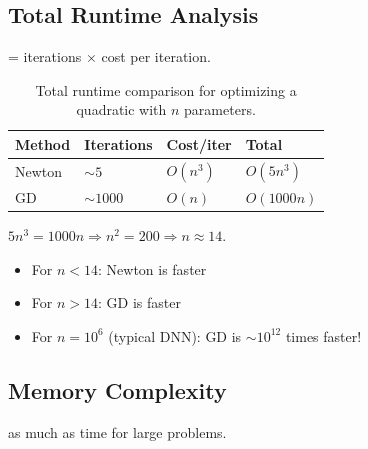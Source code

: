 \subsection{Total Runtime Analysis}

 = iterations $\times$ cost per iteration.



\begin{table}[ht]
\centering
\begin{tabular}{p{}p{}p{}p{}}
\toprule
\textbf{Method} & \textbf{Iterations} & \textbf{Cost/iter} & \textbf{Total} \\
\midrule
Newton & $\sim 5$ & $O(n^3)$ & $O(5n^3)$ \\
GD & $\sim 1000$ & $O(n)$ & $O(1000n)$ \\
\bottomrule
\end{tabular}
\vspace{2em}
\caption{Total runtime comparison for optimizing a quadratic with $n$ parameters.}
\label{tab:total_runtime}
\end{table}

 $5n^3 = 1000n \Rightarrow n^2 = 200 \Rightarrow n \approx 14$.

\begin{itemize}
    \item For $n < 14$: Newton is faster
    \item For $n > 14$: GD is faster
    \item For $n = 10^6$ (typical DNN): GD is $\sim 10^{12}$ times faster!
\end{itemize}



\subsection{Memory Complexity}

 as much as time for large problems.

